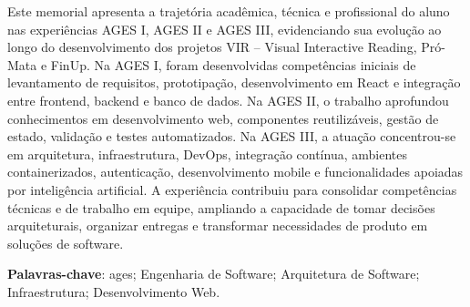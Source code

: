 \begin{resumo}
Este memorial apresenta a trajetória acadêmica, técnica e profissional do aluno
nas experiências AGES I, AGES II e AGES III, evidenciando sua evolução ao longo
do desenvolvimento dos projetos VIR -- Visual Interactive Reading, Pró-Mata e
FinUp. Na AGES I, foram desenvolvidas competências iniciais de levantamento de
requisitos, prototipação, desenvolvimento em React e integração entre frontend,
backend e banco de dados. Na AGES II, o trabalho aprofundou conhecimentos em
desenvolvimento web, componentes reutilizáveis, gestão de estado, validação e
testes automatizados. Na AGES III, a atuação concentrou-se em arquitetura,
infraestrutura, DevOps, integração contínua, ambientes containerizados,
autenticação, desenvolvimento mobile e funcionalidades apoiadas por inteligência
artificial. A experiência contribuiu para consolidar competências técnicas e de
trabalho em equipe, ampliando a capacidade de tomar decisões arquiteturais,
organizar entregas e transformar necessidades de produto em soluções de
software.

\textbf{Palavras-chave}: \ac{ages}; Engenharia de Software; Arquitetura de
Software; Infraestrutura; Desenvolvimento Web.
\end{resumo}
